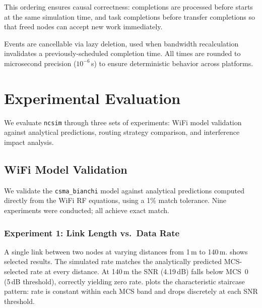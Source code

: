 \documentclass[conference]{IEEEtran}
\newcommand{\ncsim}{\texttt{ncsim}}
\begin{document}
This ordering ensures causal correctness: completions are processed before
starts at the same simulation time, and task completions before transfer
completions so that freed nodes can accept new work immediately.

Events are cancellable via lazy deletion, used when bandwidth recalculation
invalidates a previously-scheduled completion time.  All times are rounded to
microsecond precision ($10^{-6}$\,s) to ensure deterministic behavior across
platforms.

\section{Experimental Evaluation}
\label{sec:eval}

We evaluate \ncsim{} through three sets of experiments: WiFi model
validation against analytical predictions, routing strategy comparison, and
interference impact analysis.

\subsection{WiFi Model Validation}
\label{sec:validation}

We validate the \texttt{csma\_bianchi} model against analytical predictions
computed directly from the WiFi RF equations, using a 1\% match tolerance.
Nine experiments were conducted; all achieve exact match.

\subsubsection{Experiment 1: Link Length vs.\ Data Rate}

A single link between two nodes at varying distances from 1\,m to 140\,m.
 shows selected results.  The simulated rate matches the
analytically predicted MCS-selected rate at every distance.  At 140\,m the
SNR (4.19\,dB) falls below MCS~0 (5\,dB threshold), correctly yielding zero
rate.   plots the characteristic staircase pattern: rate
is constant within each MCS band and drops discretely at each SNR threshold.
\end{document}
